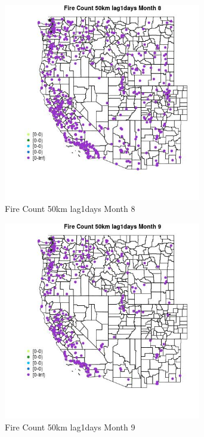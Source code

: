 \begin{figure} 
\centering  
\includegraphics[width=0.77\textwidth]{Code_Outputs/Report_ML_input_PM25_Step4_part_e_de_duplicated_aves_compiled_2019-05-18wNAs_MapObsMo8Fire_Count_50km_lag1days.jpg} 
\caption{\label{fig:Report_ML_input_PM25_Step4_part_e_de_duplicated_aves_compiled_2019-05-18wNAsMapObsMo8Fire_Count_50km_lag1days}Fire Count 50km lag1days Month 8} 
\end{figure} 
 

\begin{figure} 
\centering  
\includegraphics[width=0.77\textwidth]{Code_Outputs/Report_ML_input_PM25_Step4_part_e_de_duplicated_aves_compiled_2019-05-18wNAs_MapObsMo9Fire_Count_50km_lag1days.jpg} 
\caption{\label{fig:Report_ML_input_PM25_Step4_part_e_de_duplicated_aves_compiled_2019-05-18wNAsMapObsMo9Fire_Count_50km_lag1days}Fire Count 50km lag1days Month 9} 
\end{figure} 
 

